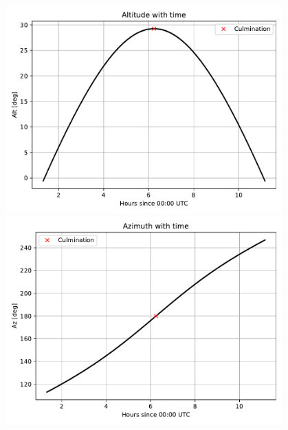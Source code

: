 \documentclass[a4paper]{article}
\begin{document}
		\begin{figure}[h!]
			\centering
			\begin{minipage}{0.48\textwidth}
				\centering
				\includegraphics[width=0.95\textwidth]{Alt.pdf}
			\end{minipage}\hfill
			\begin{minipage}{0.48\textwidth}
				\centering
				\includegraphics[width=0.95\textwidth]{Az.pdf}
			\end{minipage}
		\end{figure}

		
\end{document}
